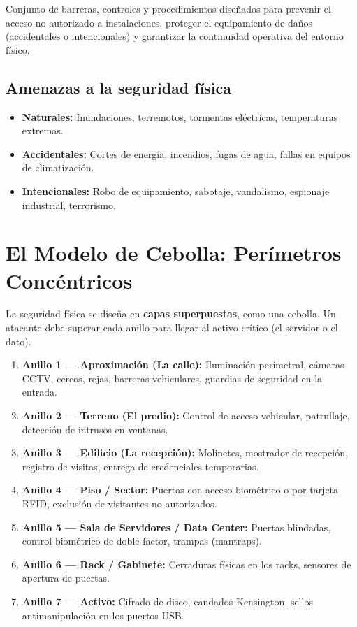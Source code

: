 \documentclass[11pt,a4paper]{article}
\begin{document}
\begin{definicion}
Conjunto de barreras, controles y procedimientos diseñados para prevenir el acceso no autorizado a instalaciones, proteger el equipamiento de daños (accidentales o intencionales) y garantizar la continuidad operativa del entorno físico.
\end{definicion}

\subsection{Amenazas a la seguridad física}
\begin{itemize}[leftmargin=*]
  \item \textbf{Naturales:} Inundaciones, terremotos, tormentas eléctricas, temperaturas extremas.
  \item \textbf{Accidentales:} Cortes de energía, incendios, fugas de agua, fallas en equipos de climatización.
  \item \textbf{Intencionales:} Robo de equipamiento, sabotaje, vandalismo, espionaje industrial, terrorismo.
\end{itemize}

\section{El Modelo de Cebolla: Perímetros Concéntricos}
La seguridad física se diseña en \textbf{capas superpuestas}, como una cebolla. Un atacante debe superar cada anillo para llegar al activo crítico (el servidor o el dato).

\begin{enumerate}[leftmargin=*]
  \item \textbf{Anillo 1 --- Aproximación (La calle):} Iluminación perimetral, cámaras CCTV, cercos, rejas, barreras vehiculares, guardias de seguridad en la entrada.
  \item \textbf{Anillo 2 --- Terreno (El predio):} Control de acceso vehicular, patrullaje, detección de intrusos en ventanas.
  \item \textbf{Anillo 3 --- Edificio (La recepción):} Molinetes, mostrador de recepción, registro de visitas, entrega de credenciales temporarias.
  \item \textbf{Anillo 4 --- Piso / Sector:} Puertas con acceso biométrico o por tarjeta RFID, exclusión de visitantes no autorizados.
  \item \textbf{Anillo 5 --- Sala de Servidores / Data Center:} Puertas blindadas, control biométrico de doble factor, trampas (mantraps).
  \item \textbf{Anillo 6 --- Rack / Gabinete:} Cerraduras físicas en los racks, sensores de apertura de puertas.
  \item \textbf{Anillo 7 --- Activo:} Cifrado de disco, candados Kensington, sellos antimanipulación en los puertos USB.
\end{enumerate}
\end{document}
